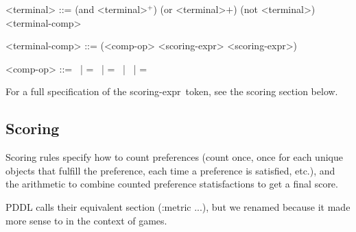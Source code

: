 \documentclass{article}
\begin{document}
\begin{grammar}
<terminal> ::= (and <terminal>$^+$) \alt
        (or <terminal>$+$) \alt
        (not <terminal>) \alt
        <terminal-comp>

<terminal-comp> ::= (<comp-op> <scoring-expr> <scoring-expr>) 
    
    <comp-op> ::=  \textlangle \ | \textlangle = \ | = \ | \textrangle \ | \textrangle =



\end{grammar}
For a full specification of the \textlangle scoring-expr\textrangle\ token, see the scoring section below.
        


\subsection{Scoring}
Scoring rules specify how to count preferences (count once, once for each unique objects that fulfill the preference, each time a preference is satisfied, etc.), and the arithmetic to combine
        counted preference statisfactions to get a final score.
        
        PDDL calls their equivalent section (:metric ...), but we renamed because it made more sense to in the context of games. 
        
\end{document}
